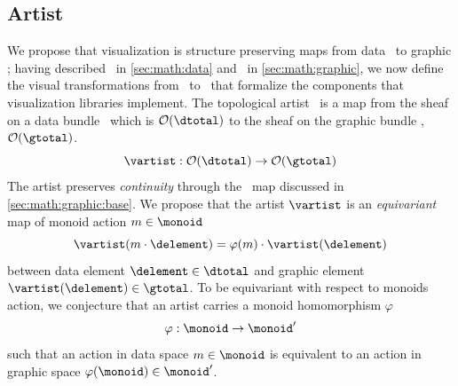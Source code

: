 \documentclass[../main.tex]{subfiles}
\begin{document}
\subsection{Artist}
\label{sec:artist}
We propose that visualization is structure preserving maps from data \dtotal\ to graphic \gtotal; having described \dtotal\ in \autoref{sec:math:data} and \gtotal\ in \autoref{sec:math:graphic}, we now define the visual transformations from \dtotal\ to \gtotal\ that formalize the components that visualization libraries implement. The topological artist \vartist\ is a map from the sheaf on a data bundle \dtotal\ which is \(\mathcal{O}(\dtotal)\) to the sheaf on the graphic bundle \gtotal, \(\mathcal{O}(\gtotal)\). 
\begin{equation}
    \vartist: \mathcal{O}(\dtotal) \rightarrow \mathcal{O}(\gtotal)
    \label{eq:math:artist:artist}
\end{equation}
The artist preserves \textit{continuity} through the \vindex\ map discussed in \autoref{sec:math:graphic:base}.  We propose that the artist \(\mathscr{\vartist}\) is an \textit{equivariant} map of monoid action  \(m \in \monoid\)
\begin{equation}
\vartist(m\cdot \delement) = \varphi(m)\cdot \vartist(\delement) 
\end{equation}
between data element \(\delement \in \mathscr{\dtotal}\) and graphic element \(\vartist(\delement) \in \mathscr{\gtotal}\). To be equivariant with respect to monoids action, we conjecture that an artist carries a monoid homomorphism \(\varphi\)
\begin{equation}
    \varphi: \monoid \rightarrow \monoid^{\prime}
\end{equation}
such that an action in data space \(m \in \monoid\) is equivalent to an action in graphic space \(\varphi(\monoid) \in \monoid^{\prime}\). 
\end{document}
